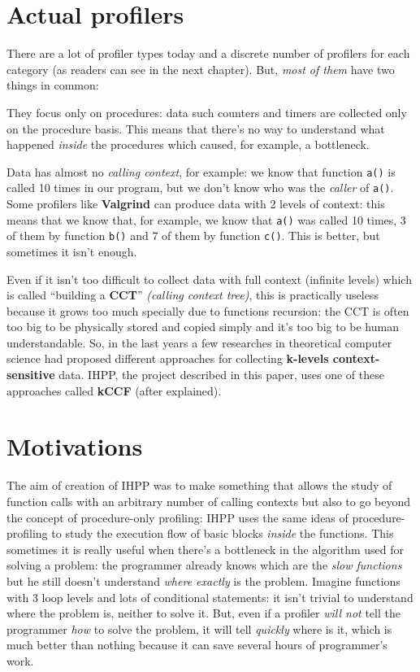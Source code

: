 \documentclass[a4paper,11pt]{report}
\begin{document}
\section{Actual profilers}

There are a lot of profiler types today and a discrete number of profilers for
each category (as readers can see in the next chapter). But, \emph{most of them}
have two things in common:

\begin{itemize*}

\item They focus only on procedures: data such counters and timers are collected
only on the procedure basis. This means that there's no way to understand what
happened \emph{inside} the procedures which caused, for example, a bottleneck.

\item Data has almost no \emph{calling context}, for example: we know that
function \verb|a()| is called 10 times in our program, but we don't know who was
the \emph{caller} of \verb|a()|. Some profilers like \textbf{Valgrind} can
produce data with 2 levels of context: this means that we know that, for
example, we know that \verb|a()| was called 10 times, 3 of them by function
\verb|b()| and 7 of them by function \verb|c()|. This is better, but sometimes
it isn't enough.

\end{itemize*}

Even if it isn't too difficult to collect data with full context (infinite
levels) which is called ``building a \textbf{CCT}'' \emph{(calling context
tree)}, this is practically useless because it grows too much specially due to
functions recursion: the CCT is often too big to be physically stored and copied
simply and it's too big to be human understandable.
So, in the last years a few researches in theoretical computer science had
proposed different approaches for collecting \textbf{k-levels context-sensitive}
data. IHPP, the project described in this paper, uses one of these approaches
called \textbf{kCCF} (after explained).

\section{Motivations}

The aim of creation of IHPP was to make something that allows the study of
function calls with an arbitrary number of calling contexts but also to go
beyond the concept of procedure-only profiling: IHPP uses the same ideas of
procedure-profiling to study the execution flow of basic blocks \emph{inside}
the functions. This sometimes it is really useful when there's a bottleneck in
the algorithm used for solving a problem: the programmer already knows which are
the \emph{slow functions} but he still doesn't understand \emph{where exactly}
is the problem. Imagine functions with 3 loop levels and lots of conditional
statements: it isn't trivial to understand where the problem is, neither to
solve it. But, even if a profiler \emph{will not} tell the programmer \emph{how}
to solve the problem, it will tell \emph{quickly} where is it, which is much
better than nothing because it can save several hours of programmer's work.
\end{document}
